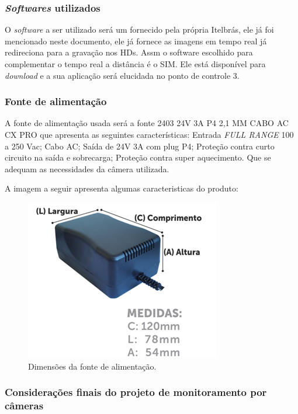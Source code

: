\subsubsection{\textit{Softwares} utilizados}
	
	O \textit{software} a ser utilizado será um fornecido pela própria Itelbrás, ele já foi mencionado neste documento, ele já fornece as imagens em tempo real já redireciona para a gravação nos HDs. Assm o software escolhido para complementar o tempo real a distância é o SIM. Ele está disponível para \textit{download} e a sua aplicação será elucidada no ponto de controle 3.

\subsubsection{Fonte de alimentação}

	A fonte de alimentação usada será a fonte 2403 24V 3A P4 2,1 MM CABO AC CX PRO que apresenta as seguintes características: Entrada \textit{FULL RANGE} 100 a 250 Vac; Cabo AC; Saída de 24V 3A com plug P4;  Proteção contra curto circuito na saída e sobrecarga; Proteção contra super aquecimento. Que se adequam as necessidades da câmera utilizada.

A imagem a seguir apresenta algumas caracteristicas do produto:


	\begin{figure}[H]
	 \centering
	\label{Dimensões da fonte de alimentação}
	 \includegraphics[keepaspectratio=true,scale=0.8]{monitoramento/23.png}
	 \caption{Dimensões da fonte de alimentação.}
	\end{figure}
	

\subsubsection{Considerações finais do projeto de monitoramento por câmeras}

